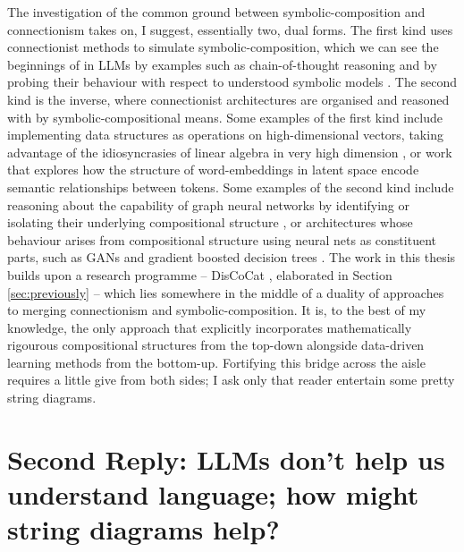 The investigation of the common ground between symbolic-composition and connectionism takes on, I suggest, essentially two, dual forms. The first kind uses connectionist methods to simulate symbolic-composition, which we can see the beginnings of in LLMs by examples such as chain-of-thought reasoning \citep{wei_chain--thought_2023-1} and by probing their behaviour with respect to understood symbolic models \citep{koralus_humans_2023}. The second kind is the inverse, where connectionist architectures are organised and reasoned with by symbolic-compositional means. Some examples of the first kind include implementing data structures as operations on high-dimensional vectors, taking advantage of the idiosyncrasies of linear algebra in very high dimension \citep{kanerva_computing_2019}, or work that explores how the structure of word-embeddings in latent space encode semantic relationships between tokens. Some examples of the second kind include reasoning about the capability of graph neural networks by identifying or isolating their underlying compositional structure \citep{liu_seeing_2023}, or architectures whose behaviour arises from compositional structure using neural nets as constituent parts, such as GANs \citep{goodfellow_generative_2014} and gradient boosted decision trees \citep{chen_xgboost_2016}. The work in this thesis builds upon a research programme -- DisCoCat \citep{coecke_mathematical_2010}, elaborated in Section \ref{sec:previously} -- which lies somewhere in the middle of a duality of approaches to merging connectionism and symbolic-composition. It is, to the best of my knowledge, the only approach that explicitly incorporates mathematically rigourous compositional structures from the top-down alongside data-driven learning methods from the bottom-up. Fortifying this bridge across the aisle requires a little give from both sides; I ask only that reader entertain some pretty string diagrams.

\section{\textbf{Second Reply:} LLMs don't help us understand language; how might string diagrams help?}

